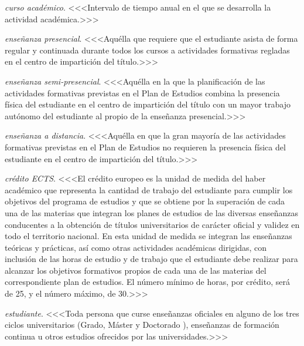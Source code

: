     \item \emph{curso académico}. <<<Intervalo de tiempo anual en el que se desarrolla la actividad académica.>>>

    \item \emph{enseñanza presencial}. <<<Aquélla que requiere que el estudiante asista de forma regular y continuada durante todos los cursos a actividades formativas regladas en el centro de impartición del título\cite[página 10]{guiaMadridMasD}.>>>

    \item \emph{enseñanza semi-presencial}. <<<Aquélla en la que la planificación de las actividades formativas previstas en el Plan de Estudios combina la presencia física del estudiante en el centro de impartición del título con un mayor trabajo autónomo del estudiante al propio de la enseñanza presencial\cite[página 10]{guiaMadridMasD}.>>>

    \item \emph{enseñanza a distancia}. <<<Aquélla en que la gran mayoría de las actividades formativas previstas en el Plan de Estudios no requieren la presencia física del estudiante en el centro de impartición del título\cite[página 10]{guiaMadridMasD}.>>>

    \item \emph{crédito ECTS}. <<<El crédito europeo es la unidad de medida del haber académico que representa la cantidad de trabajo del estudiante para cumplir los objetivos del programa de estudios y que se obtiene por la superación de cada una de las materias que integran los planes de estudios de las diversas enseñanzas conducentes a la obtención de títulos universitarios de carácter oficial y validez en todo el territorio nacional. En esta unidad de medida se integran las enseñanzas teóricas y prácticas, así como otras actividades académicas dirigidas, con inclusión de las horas de estudio y de trabajo que el estudiante debe realizar para alcanzar los objetivos formativos propios de cada una de las materias del correspondiente plan de estudios\cite[artículo 3]{rdECTS}. El número mínimo de horas, por crédito, será de 25, y el número máximo, de 30\cite[artículo 4, apartado 5]{rdECTS}.>>>

    \item \emph{estudiante}. <<<Toda  persona  que  curse  enseñanzas  oficiales en alguno de los tres ciclos universitarios (Grado, Máster y Doctorado \cite[artículo 8]{rd1393}), enseñanzas de formación continua u otros estudios ofrecidos por las universidades\cite[artículo 1, apartado 3]{estatutoEstudiante}.>>>


